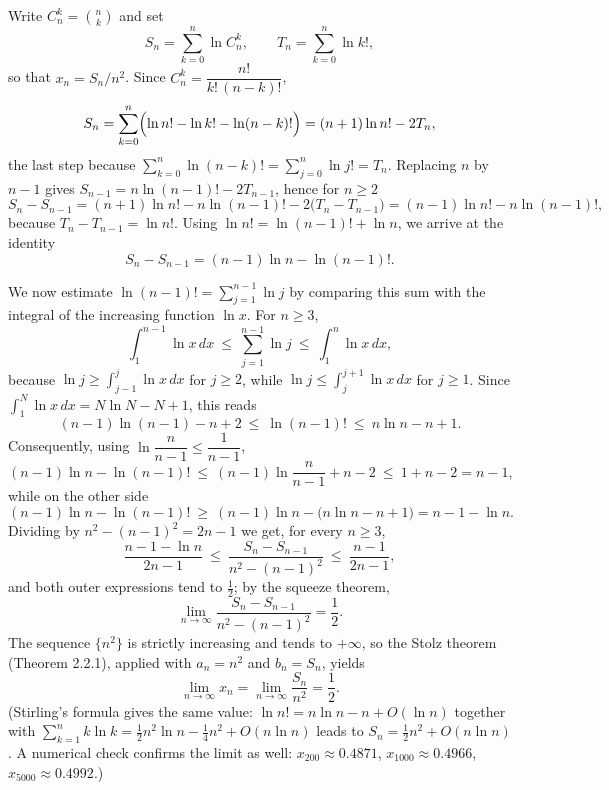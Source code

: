 \documentclass[11pt,a4paper]{article}
\newenvironment{solution}[1]{%
  \par\addvspace{1.7ex}%
  \noindent{\color{solutioncolor}\textbf{#1}}\hspace{0.55em}\ignorespaces}%
  {\par\addvspace{0.9ex}}
\begin{document}
\begin{solution}{Solution 2.2.5}\label{xs:2.2.5}
Write $C_n^k=\binom{n}{k}$ and set
\[
S_n=\sum_{k=0}^{n}\ln C_n^k,\qquad T_n=\sum_{k=0}^{n}\ln k!,
\]
so that $x_n=S_n/n^{2}$. Since $C_n^k=\dfrac{n!}{k!\,(n-k)!}$,
\[
S_n=\sum_{k=0}^{n}\Bigl(\ln n!-\ln k!-\ln(n-k)!\Bigr)=(n+1)\ln n!-2T_n,
\]
the last step because $\sum_{k=0}^{n}\ln(n-k)!=\sum_{j=0}^{n}\ln j!=T_n$. Replacing $n$ by $n-1$ gives $S_{n-1}=n\ln(n-1)!-2T_{n-1}$, hence for $n\ge2$
\[
S_n-S_{n-1}=(n+1)\ln n!-n\ln(n-1)!-2\bigl(T_n-T_{n-1}\bigr)
=(n-1)\ln n!-n\ln(n-1)! ,
\]
because $T_n-T_{n-1}=\ln n!$. Using $\ln n!=\ln(n-1)!+\ln n$, we arrive at the identity
\[
S_n-S_{n-1}=(n-1)\ln n-\ln(n-1)! .
\]

We now estimate $\ln(n-1)!=\sum_{j=1}^{n-1}\ln j$ by comparing this sum with the integral of the increasing function $\ln x$. For $n\ge3$,
\[
\int_{1}^{n-1}\ln x\,dx\ \le\ \sum_{j=1}^{n-1}\ln j\ \le\ \int_{1}^{n}\ln x\,dx ,
\]
because $\ln j\ge\int_{j-1}^{j}\ln x\,dx$ for $j\ge2$, while $\ln j\le\int_{j}^{j+1}\ln x\,dx$ for $j\ge1$. Since $\int_{1}^{N}\ln x\,dx=N\ln N-N+1$, this reads
\[
(n-1)\ln(n-1)-n+2\ \le\ \ln(n-1)!\ \le\ n\ln n-n+1 .
\]
Consequently, using $\ln\dfrac{n}{n-1}\le\dfrac{1}{n-1}$,
\[
(n-1)\ln n-\ln(n-1)!\ \le\ (n-1)\ln\frac{n}{n-1}+n-2\ \le\ 1+n-2=n-1 ,
\]
while on the other side
\[
(n-1)\ln n-\ln(n-1)!\ \ge\ (n-1)\ln n-\bigl(n\ln n-n+1\bigr)=n-1-\ln n .
\]
Dividing by $n^{2}-(n-1)^{2}=2n-1$ we get, for every $n\ge3$,
\[
\frac{n-1-\ln n}{2n-1}\ \le\ \frac{S_n-S_{n-1}}{n^{2}-(n-1)^{2}}\ \le\ \frac{n-1}{2n-1},
\]
and both outer expressions tend to $\frac12$; by the squeeze theorem,
\[
\lim_{n\to\infty}\frac{S_n-S_{n-1}}{n^{2}-(n-1)^{2}}=\frac12 .
\]
The sequence $\{n^{2}\}$ is strictly increasing and tends to $+\infty$, so the Stolz theorem (Theorem 2.2.1), applied with $a_n=n^{2}$ and $b_n=S_n$, yields
\[
\lim_{n\to\infty}x_n=\lim_{n\to\infty}\frac{S_n}{n^{2}}=\frac12 .
\]
(Stirling's formula gives the same value: $\ln n!=n\ln n-n+O(\ln n)$ together with $\sum_{k=1}^{n}k\ln k=\frac12n^{2}\ln n-\frac14n^{2}+O(n\ln n)$ leads to $S_n=\frac12n^{2}+O(n\ln n)$. A numerical check confirms the limit as well: $x_{200}\approx0.4871$, $x_{1000}\approx0.4966$, $x_{5000}\approx0.4992$.)
\end{solution}
\end{document}
